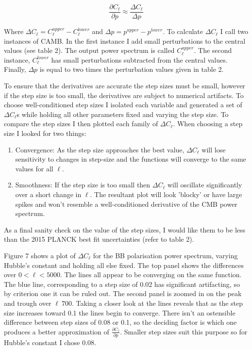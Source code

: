 \begin{equation}
\frac{\partial C_{\ell}}{\partial p} \approx \frac{\Delta C_{\ell}}{\Delta p}
\end{equation}
 
Where $\Delta C_{\ell} = C^{upper}_{\ell} - C^{lower}_{\ell}$ and $\Delta p = p^{upper} - p^{lower}$. To calculate $\Delta C_{\ell}$ I call two instances of CAMB. In the first instance I add small perturbations to the central values (see table 2). The output power spectrum is called $C^{upper}_{\ell}$. The second instance, $C^{lower}_{\ell}$ has small perturbations subtracted from the central values. Finally, $\Delta p$ is equal to two times the perturbation values given in table 2.

To ensure that the derivatives are accurate the step sizes must be small, however if the step size is too small, the derivatives are subject to numerical artifacts. To choose well-conditioned step sizes I isolated each variable and generated a set of $\Delta C_{\ell}$s while holding all other parameters fixed and varying the step size. To compare the step sizes I then plotted each family of $\Delta C_{\ell}$. When choosing a step size I looked for two things:

\begin{enumerate}
\item Convergence: As the step size approaches the best value, $\Delta C_{\ell}$ will lose sensitivity to changes in step-size and the functions will converge to the same values for all $\ell$.

\item Smoothness: If the step size is too small then $\Delta C_{\ell}$ will oscillate significantly over a short change in $\ell$. The resultant plot will look 'blocky' or have large spikes and won't resemble a well-conditioned derivative of the CMB power spectrum.
\end{enumerate}

As a final sanity check on the value of the step sizes, I would like them to be less than the 2015 PLANCK best fit uncertainties (refer to table 2).
 
Figure 7 shows a plot of $\Delta C_{\ell}$ for the BB polarisation power spectrum, varying Hubble's constant and holding all else fixed. The top panel shows the differences over $ 0 < \ell < 5000$. The lines all appear to be converging on the same function. The blue line, corresponding to a step size of 0.02 has significant artifacting, so by criterion one it can be ruled out. The second panel is zoomed in on the peak and trough over $\ell ~ 700$. Taking a closer look at the lines reveals that as the step size increases toward 0.1 the lines begin to converge. There isn't an ostensible difference between step sizes of 0.08 or 0.1, so the deciding factor is which one produces a better approximation of $\frac{\partial C_{\ell}}{\partial p}$. Smaller step sizes suit this purpose so for Hubble's constant I chose 0.08.
 

